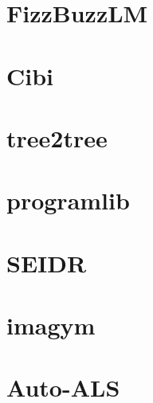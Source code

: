 \section{FizzBuzzLM}

\section{Cibi}

\section{tree2tree}

\section{programlib}

\section{SEIDR}

\section{imagym}

\section{Auto-ALS}